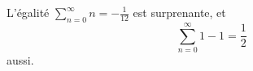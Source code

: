 L'égalité $\sum_{n=0}^{\infty} n = -\frac{1}{12}$ est
surprenante, et \[\sum_{n=0}^{\infty} 1-1 = \frac{1}{2}\]
aussi.
